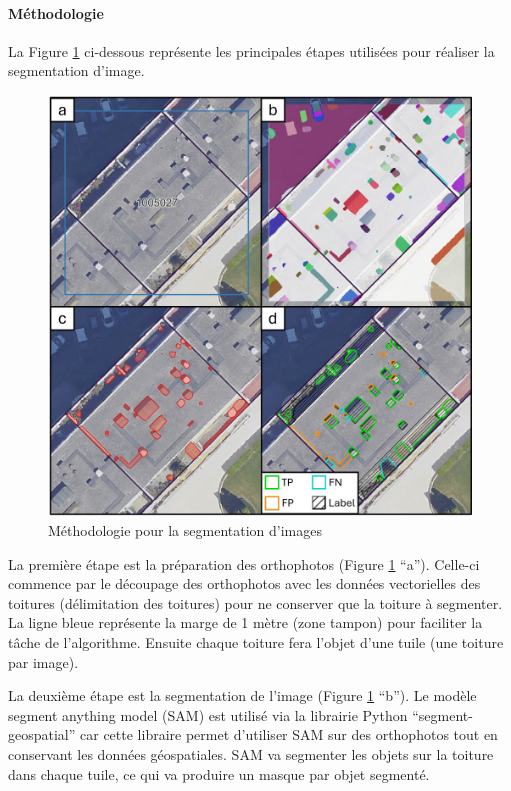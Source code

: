 {{{{\paragraph{Méthodologie}
La Figure \ref{fig:stdl_08_methodo_segmentation_images} ci-dessous représente les principales étapes utilisées pour réaliser la segmentation d'image.
\begin{figure}[H]
    \centering
    \includegraphics[width=1\linewidth]{02-main//figures/stdl_08_methodo_segmentation_images.png}
    \caption{Méthodologie pour la segmentation d’images \cite{herny_detection_2024}}
    \label{fig:stdl_08_methodo_segmentation_images}
\end{figure}

\par{La première étape est la préparation des orthophotos (Figure \ref{fig:stdl_08_methodo_segmentation_images} ``a''). Celle-ci commence par le découpage des orthophotos avec les données vectorielles des toitures (délimitation des toitures) pour ne conserver que la toiture à segmenter. La ligne bleue représente la marge de 1 mètre (zone tampon) pour faciliter la tâche de l'algorithme. Ensuite chaque toiture fera l'objet d'une tuile (une toiture par image).}

\par{La deuxième étape est la segmentation de l'image (Figure \ref{fig:stdl_08_methodo_segmentation_images} ``b''). Le modèle segment anything model (SAM) est utilisé via la librairie Python ``segment-geospatial'' \cite{wu_samgeo_2023} car cette libraire permet d'utiliser SAM sur des orthophotos tout en conservant les données géospatiales. SAM va segmenter les objets sur la toiture dans chaque tuile, ce qui va produire un masque par objet segmenté.}

}}}}
